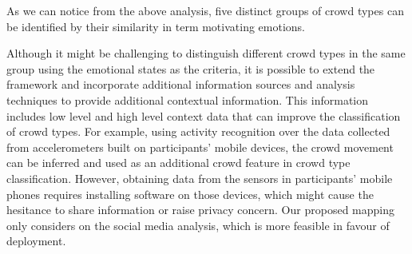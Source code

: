 As we can notice from the above analysis, five distinct groups of crowd types can be identified by their similarity in term motivating emotions. 


Although it might be challenging to distinguish different crowd types in the same group using the emotional states as the criteria, it is possible to extend the framework and incorporate additional information sources and analysis techniques to provide additional contextual information. This information includes low level and high level context data that can improve the classification of crowd types. For example, using activity recognition over the data collected from accelerometers built on participants' mobile devices, the crowd movement can be inferred and used as an additional crowd feature in crowd type classification. However, obtaining data from the sensors in participants' mobile phones requires installing software on those devices, which might cause the hesitance to share information or raise privacy concern. Our proposed mapping only considers on the social media analysis, which is more feasible in favour of deployment.

